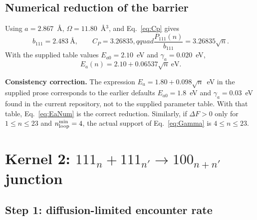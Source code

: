 \documentclass[11pt,a4paper]{article}
\begin{document}
\subsection{Numerical reduction of the barrier}

Using $a=2.867$~\AA, $\Omega=11.80$~\AA$^3$, and Eq.~\eqref{eq:Cp} gives
\begin{equation}
 b_{111}=2.483~\text{\AA},\qquad C_P=3.26835,qquad
 \frac{P_{111}(n)}{b_{111}}=3.26835\sqrt n.                            \label{eq:CpNum}
\end{equation}
With the supplied table values $E_{a0}=2.10$~eV and
$\gamma_a=0.020$~eV,
\begin{equation}
 \boxed{E_a(n)=2.10+0.06537\sqrt n\ \text{eV}.}                       \label{eq:EaNum}
\end{equation}

\noindent\colorbox{warn}{\parbox{0.96\linewidth}{
\textbf{Consistency correction.}  The expression
$E_a=1.80+0.098\sqrt n$~eV in the supplied prose corresponds to the earlier
defaults $E_{a0}=1.8$~eV and $\gamma_a=0.03$~eV found in the current repository,
not to the supplied parameter table.  With that table, Eq.~\eqref{eq:EaNum} is
the correct reduction.  Similarly, if $\Delta F>0$ only for $1\le n\le23$ and
$n_{\rm loop}^{\min}=4$, the actual support of Eq.~\eqref{eq:Gamma} is
$4\le n\le23$.}}

\section{Kernel 2: $111_n+111_{n'}\rightarrow100_{n+n'}$ junction}
\label{sec:junction}

\subsection{Step 1: diffusion-limited encounter rate}
\end{document}
